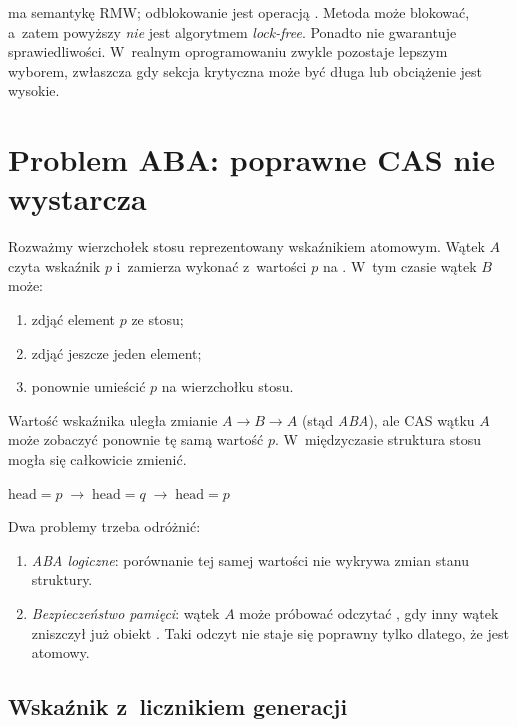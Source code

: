  ma semantykę RMW; odblokowanie jest operacją
. Metoda  może blokować, a~zatem
powyższy  \emph{nie} jest algorytmem \emph{lock-free}.
Ponadto nie gwarantuje sprawiedliwości. W~realnym oprogramowaniu
 zwykle pozostaje lepszym wyborem, zwłaszcza gdy
sekcja krytyczna może być długa lub obciążenie jest wysokie.

\section{Problem ABA: poprawne CAS nie wystarcza}
\label{sec:cpp16-aba}

Rozważmy wierzchołek stosu reprezentowany wskaźnikiem atomowym.
Wątek \(A\) czyta wskaźnik \(p\) i~zamierza wykonać
 z~wartości \(p\) na .
W~tym czasie wątek \(B\) może:
\begin{enumerate}
\item zdjąć element \(p\) ze stosu;
\item zdjąć jeszcze jeden element;
\item ponownie umieścić \(p\) na wierzchołku stosu.
\end{enumerate}

Wartość wskaźnika uległa zmianie \(A\to B\to A\) (stąd \emph{ABA}),
ale CAS wątku \(A\) może zobaczyć ponownie tę samą wartość \(p\).
W~międzyczasie struktura stosu mogła się całkowicie zmienić.

\begin{center}
\(\boxed{\text{head}=p}\;\longrightarrow\;
  \boxed{\text{head}=q}\;\longrightarrow\;
  \boxed{\text{head}=p}\)
\end{center}

Dwa problemy trzeba odróżnić:
\begin{enumerate}
\item \emph{ABA logiczne}: porównanie tej samej wartości nie wykrywa
      zmian stanu struktury.
\item \emph{Bezpieczeństwo pamięci}: wątek \(A\) może próbować odczytać
      , gdy inny wątek zniszczył już obiekt .
      Taki odczyt nie staje się poprawny tylko dlatego, że 
      jest atomowy.
\end{enumerate}

\subsection{Wskaźnik z~licznikiem generacji}


